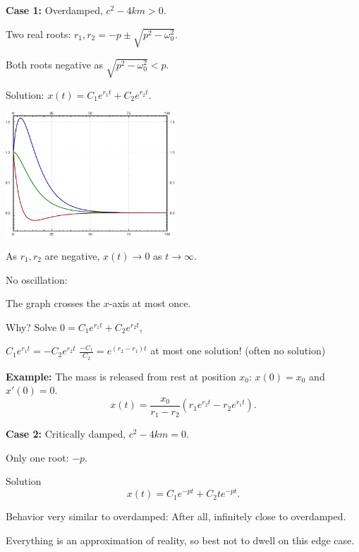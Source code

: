 \documentclass[10pt,aspectratio=169]{beamer}
\begin{document}
\begin{frame}
\textbf{Case 1:}
Overdamped, \quad $c^2-4km > 0$.

\medskip
\pause

Two real roots: \quad $r_1,r_2 = -p \pm \sqrt{p^2 - \omega_0^2}$.

\medskip
\pause

Both roots negative as \quad $\sqrt{p^2 - \omega_0^2} < p$.

\medskip
\pause

Solution: \quad
$x(t) = C_1 e^{r_1 t} + C_2 e^{r_2 t}$.

\vspace*{-1.1in}

\hfill\includegraphics[width=2.5in]{../figures/mv-overdamped}

\vspace*{-0.69in}

As $r_1,r_2$ are negative, \quad
$x(t) \to 0$ as $t \to \infty$.

\medskip
\pause

No oscillation:

The graph crosses the
$x$-axis at most once.

\pause

Why?  Solve $0 = C_1 e^{r_1 t} + C_2 e^{r_2 t}$,

\pause

\thus\quad $C_1 e^{r_1 t} = - C_2 e^{r_2 t}$
\pause
\wthus
$\frac{-C_1}{C_2} = e^{(r_2-r_1) t}$
\wthus
at most one solution! (often no solution)

\medskip
\pause

\textbf{Example:}
The mass is released from rest at position $x_0$:
$x(0) = x_0$ and $x'(0) = 0$.
\[
x(t) = \frac{x_0}{r_1-r_2} \left(r_1 e^{r_2 t} - r_2 e^{r_1 t} \right) .
\]
\end{frame}

\begin{frame}
\textbf{Case 2:} 
Critically damped, \quad $c^2 - 4km = 0$.

\medskip
\pause

Only one root: \quad $-p$.

\medskip
\pause

Solution
\[
x(t) = C_1 e^{-pt} + C_2 t e^{-pt} .
\]

\medskip
\pause

Behavior very similar to overdamped: After all, infinitely close
to overdamped.

\medskip
\pause

Everything is an approximation of reality,
so best not to dwell on this edge case.

\end{frame}
\end{document}
